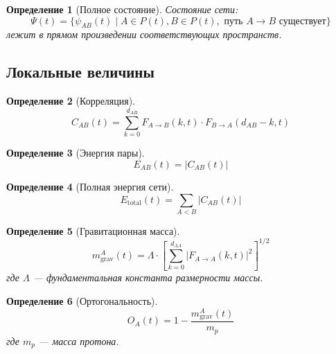 \documentclass[11pt,a4paper]{article}
\newtheorem{definition}{Определение}[section]
\theoremstyle{definition}
\begin{document}
\begin{definition}[Полное состояние]
Состояние сети:
\begin{equation}
    \Psi(t) = \{\psi_{AB}(t) \mid A \in P(t), B \in P(t), \text{ путь } A \to B \text{ существует}\}
\end{equation}
лежит в прямом произведении соответствующих пространств.
\end{definition}

\subsection{Локальные величины}

\begin{definition}[Корреляция]
\begin{equation}
    C_{AB}(t) = \sum_{k=0}^{d_{AB}} F_{A \to B}(k, t) \cdot F_{B \to A}(d_{AB} - k, t)
\end{equation}
\end{definition}

\begin{definition}[Энергия пары]
\begin{equation}
    E_{AB}(t) = |C_{AB}(t)|
\end{equation}
\end{definition}

\begin{definition}[Полная энергия сети]
\begin{equation}
    E_{\text{total}}(t) = \sum_{A < B} |C_{AB}(t)|
\end{equation}
\end{definition}

\begin{definition}[Гравитационная масса]
\begin{equation}
    m_{\text{grav}}^A(t) = \Lambda \cdot \left[ \sum_{k=0}^{d_{AA}} |F_{A \to A}(k, t)|^2 \right]^{1/2}
\end{equation}
где $\Lambda$ --- фундаментальная константа размерности массы.
\end{definition}

\begin{definition}[Ортогональность]
\begin{equation}
    O_A(t) = 1 - \frac{m_{\text{grav}}^A(t)}{m_p}
\end{equation}
где $m_p$ --- масса протона.
\end{definition}
\end{document}
